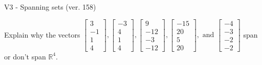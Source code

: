 \begin{exercise}
  \begin{exerciseTitle}V3 - Spanning sets (ver. 158)\end{exerciseTitle}
  \begin{exerciseStatement}
    Explain why the vectors \(\left[\begin{array}{r}
3 \\
-1 \\
1 \\
4
\end{array}\right] , \left[\begin{array}{r}
-3 \\
4 \\
1 \\
4
\end{array}\right] , \left[\begin{array}{r}
9 \\
-12 \\
-3 \\
-12
\end{array}\right] , \left[\begin{array}{r}
-15 \\
20 \\
5 \\
20
\end{array}\right] , \text{ and } \left[\begin{array}{r}
-4 \\
-3 \\
-2 \\
-2
\end{array}\right]\) span or don't span \(\mathbb{R}^4\). 
	



\end{exerciseStatement}
\end{exercise}
